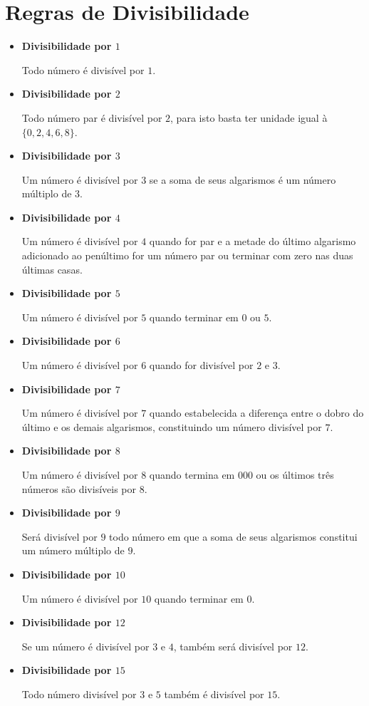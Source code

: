  \newpage
 \section{Regras de Divisibilidade}
 \begin{itemize}
  \item \textbf{Divisibilidade por $1$}

 Todo número é divisível por $1$.

 \item \textbf{Divisibilidade por $2$}

 Todo número par é divisível por $2$, para isto basta ter unidade igual à $\{0, 2, 4, 6, 8\}$.

 \item \textbf{Divisibilidade por $3$}

 Um número é divisível por $3$ se a soma de seus algarismos é um número múltiplo de $3$.

 \item \textbf{Divisibilidade por $4$}

 Um número é divisível por $4$ quando for par e a metade do último algarismo adicionado ao penúltimo for um número par ou terminar com zero nas duas últimas casas.

 \item \textbf{Divisibilidade por $5$}

 Um número é divisível por $5$ quando terminar em $0$ ou $5$.

 \item \textbf{Divisibilidade por $6$}

 Um número é divisível por $6$ quando for divisível por $2$ e $3$.

 \item \textbf{Divisibilidade por $7$}

 Um número é divisível por $7$ quando estabelecida a diferença entre o dobro do último e os demais algarismos, constituindo um número divisível por $7$.

 \item \textbf{Divisibilidade por $8$}

 Um número é divisível por $8$ quando termina em $000$ ou os últimos três números são divisíveis por $8$.

 \item \textbf{Divisibilidade por $9$}

 Será divisível por $9$ todo número em que a soma de seus algarismos constitui um número múltiplo de $9$.

 \item \textbf{Divisibilidade por $10$}

 Um número é divisível por $10$ quando terminar em $0$.

 \item \textbf{Divisibilidade por $12$}

 Se um número é divisível por $3$ e $4$, também será divisível por $12$.

 \item \textbf{Divisibilidade por $15$}

 Todo número divisível por $3$ e $5$ também é divisível por $15$.
 \end{itemize}

